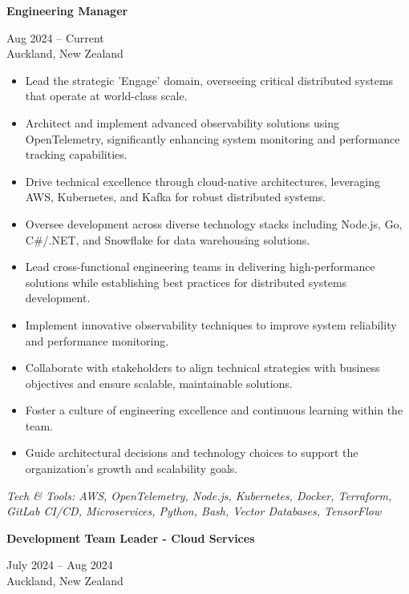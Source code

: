 \documentclass[10pt,a4paper,ragged2e,withhyper]{altacv}
\renewcommand{\cvevent}[4]{%
  \textbf{#1} %
  \hfill %
  \begin{minipage}[t]{.5\linewidth}
    \raggedleft %
    \small#3 %
    \\ %
    #4 %
  \end{minipage}
  \vspace{\baselineskip} %
}
\begin{document}



\cvevent{Engineering Manager}{Invenco by GVR}{Aug 2024 -- Current}{Auckland, New Zealand}

\begin{itemize}
\item Lead the strategic 'Engage' domain, overseeing critical distributed systems that operate at world-class scale.
\item Architect and implement advanced observability solutions using OpenTelemetry, significantly enhancing system monitoring and performance tracking capabilities.
\item Drive technical excellence through cloud-native architectures, leveraging AWS, Kubernetes, and Kafka for robust distributed systems.
\item Oversee development across diverse technology stacks including Node.js, Go, C\#/.NET, and Snowflake for data warehousing solutions.
\item Lead cross-functional engineering teams in delivering high-performance solutions while establishing best practices for distributed systems development.
\item Implement innovative observability techniques to improve system reliability and performance monitoring.
\item Collaborate with stakeholders to align technical strategies with business objectives and ensure scalable, maintainable solutions.
\item Foster a culture of engineering excellence and continuous learning within the team.
\item Guide architectural decisions and technology choices to support the organization's growth and scalability goals.
\end{itemize}

\vspace{0.5cm}

\textit{Tech \& Tools: AWS, OpenTelemetry, Node.js, Kubernetes, Docker, Terraform, GitLab CI/CD, Microservices, Python, Bash, Vector Databases, TensorFlow}

\divider

\cvevent{Development Team Leader - Cloud Services}{Invenco by GVR}{July 2024 -- Aug 2024}{Auckland, New Zealand}
\end{document}
